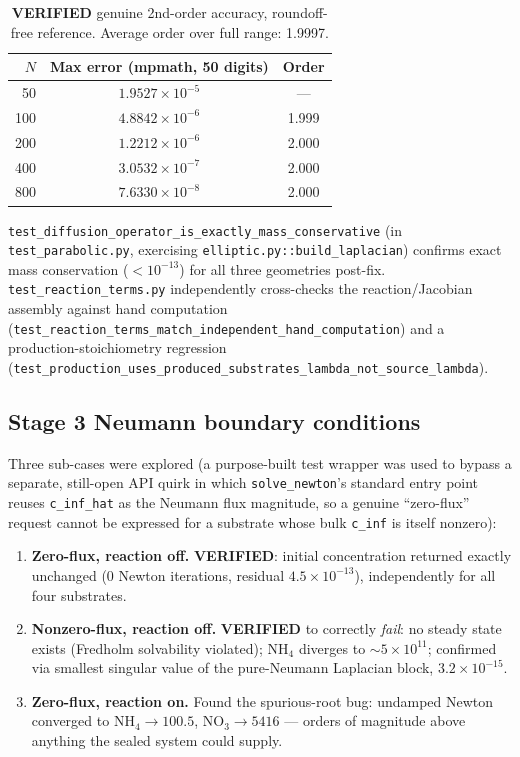 \documentclass[11pt]{article}
\newcommand{\verified}{\textcolor{green!45!black}{\textbf{VERIFIED}}}
\newcommand{\code}[1]{\texttt{#1}}
\newcommand{\test}[1]{\texttt{\small #1}}
\begin{document}
\begin{table}[h]
\centering
\small
\begin{tabular}{rcc}
\toprule
$N$ & Max error (mpmath, 50 digits) & Order \\
\midrule
50 & $1.9527\times10^{-5}$ & --- \\
100 & $4.8842\times10^{-6}$ & 1.999 \\
200 & $1.2212\times10^{-6}$ & 2.000 \\
400 & $3.0532\times10^{-7}$ & 2.000 \\
800 & $7.6330\times10^{-8}$ & 2.000 \\
\bottomrule
\end{tabular}
\caption{\verified{} genuine 2nd-order accuracy, roundoff-free reference. Average order over full range: 1.9997.}
\label{tab:mpmath}
\end{table}

\code{test\_diffusion\_operator\_is\_exactly\_mass\_conservative} (in
\code{test\_parabolic.py}, exercising \code{elliptic.py::build\_laplacian})
confirms exact mass conservation ($<10^{-13}$) for all three geometries
post-fix. \code{test\_reaction\_terms.py} independently cross-checks the
reaction/Jacobian assembly against hand computation
(\test{test\_reaction\_terms\_match\_independent\_hand\_computation}) and a
production-stoichiometry regression
(\test{test\_production\_uses\_produced\_substrates\_lambda\_not\_source\_lambda}).

\subsection{Stage 3 Neumann boundary conditions}
\label{sec:neumann-tests}
Three sub-cases were explored (a purpose-built test wrapper was used to
bypass a separate, still-open API quirk in which \code{solve\_newton}'s
standard entry point reuses \code{c\_inf\_hat} as the Neumann flux magnitude,
so a genuine ``zero-flux'' request cannot be expressed for a substrate whose
bulk \code{c\_inf} is itself nonzero):
\begin{enumerate}[label=(\alph*)]
\item \textbf{Zero-flux, reaction off.} \verified{}: initial concentration
returned exactly unchanged (0 Newton iterations, residual $4.5\times10^{-13}$),
independently for all four substrates.
\item \textbf{Nonzero-flux, reaction off.} \verified{} to correctly
\emph{fail}: no steady state exists (Fredholm solvability violated); NH$_4$
diverges to $\sim5\times10^{11}$; confirmed via smallest singular value of the
pure-Neumann Laplacian block, $3.2\times10^{-15}$.
\item \textbf{Zero-flux, reaction on.} Found the spurious-root bug: undamped
Newton converged to NH$_4\to100.5$, NO$_3\to5416$ --- orders of magnitude
above anything the sealed system could supply.
\end{enumerate}
\end{document}
